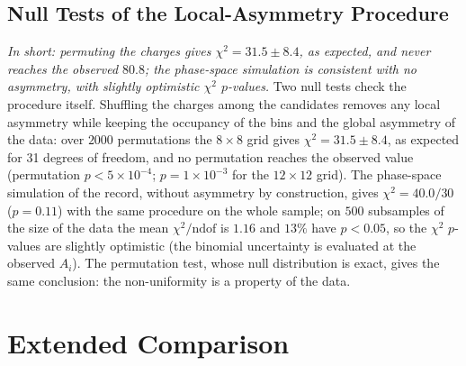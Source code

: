 \subsection{Null Tests of the Local-Asymmetry Procedure}
\label{sec:dalitz_null}
\emph{In short: permuting the charges gives $\chi^2=31.5\pm8.4$, as expected, and never reaches the observed $80.8$; the phase-space simulation is consistent with no asymmetry, with slightly optimistic $\chi^2$ $p$-values.}
Two null tests check the procedure itself. Shuffling the charges among the candidates removes any local asymmetry while keeping the occupancy of the bins and the global asymmetry of the data: over $2000$ permutations the $8\times8$ grid gives $\chi^2=31.5\pm8.4$, as expected for 31 degrees of freedom, and no permutation reaches the observed value (permutation $p<5\times10^{-4}$; $p=1\times10^{-3}$ for the $12\times12$ grid). The phase-space simulation of the record, without asymmetry by construction, gives $\chi^2=40.0/30$ ($p=0.11$) with the same procedure on the whole sample; on $500$ subsamples of the size of the data the mean $\chi^2/\mathrm{ndof}$ is $1.16$ and $13\%$ have $p<0.05$, so the $\chi^2$ $p$-values are slightly optimistic (the binomial uncertainty is evaluated at the observed $A_i$). The permutation test, whose null distribution is exact, gives the same conclusion: the non-uniformity is a property of the data.

\FloatBarrier


\section{Extended Comparison}
\label{app:ext_comp}
